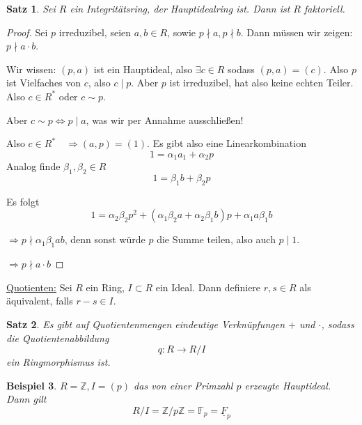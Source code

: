 \documentclass[a4paper,12pt,numbers=noenddot,parskip=full]{scrartcl}
\newcommand{\setZ}{\mathbb{Z}}
\newcommand{\heading}{\underline}
\theoremstyle{dotless}
\newtheorem{theorem}{Satz}[section]
\newtheorem{example}[theorem]{Beispiel}
\theoremstyle{remark}
\begin{document}
	\begin{theorem}
		Sei $R$ ein Integritätsring, der Hauptidealring ist. Dann ist $R$ faktoriell.
	\end{theorem}

	\begin{proof}
		Sei $p$ irreduzibel, seien $a,b \in R$, sowie $p \nmid a, p \nmid b$. Dann müssen wir zeigen: $p \nmid a \cdot b$.
		
		Wir wissen: $(p,a)$ ist ein Hauptideal, also $\exists c \in R$ sodass $(p,a) = (c)$. Also $p$ ist Vielfaches von $c$, also $c \mid p$. Aber $p$ ist irreduzibel, hat also keine echten Teiler. Also $c \in R^*$ oder $c \sim p$.
		
		Aber $c \sim p \Leftrightarrow p \mid a$, was wir per Annahme ausschließen!
		
		Also $c \in R^* \quad\Rightarrow (a,p) = (1)$. Es gibt also eine Linearkombination
		\begin{equation*}
			1 = \alpha_1 a_1 + \alpha_2 p \tag{$*$}
		\end{equation*}
		Analog finde $\beta_1, \beta_2 \in R$
		\begin{equation*}
			1 = \beta_1 b + \beta_2 p \tag{$\leftmoon$}
		\end{equation*}
		
		Es folgt
		\begin{equation*}
			1 = \alpha_2 \beta_2 p^2 + (\alpha_1 \beta_2 a + \alpha_2 \beta_1 b)p + \alpha_1 a \beta_1 b
		\end{equation*}
		
		$\Rightarrow p \nmid \alpha_1 \beta_1 a b$, denn sonst würde $p$ die Summe teilen, also auch $p \mid 1$.
		
		$\Rightarrow p \nmid a \cdot b$
	\end{proof}

	\heading{Quotienten:} Sei $R$ ein Ring, $I \subset R$ ein Ideal. Dann definiere $r,s \in R$ als äquivalent, falls $r - s \in I$.
	
	\begin{theorem}
		Es gibt auf Quotientenmengen eindeutige Verknüpfungen $+$ und $\cdot$, sodass die Quotientenabbildung
		\begin{equation*}
			q: R \to R/I
		\end{equation*}
		ein Ringmorphismus ist.
	\end{theorem}

	\begin{example}
		$R = \setZ, I = (p)$ das von einer Primzahl $p$ erzeugte Hauptideal. Dann gilt
		\begin{equation*}
			R/I = \setZ / p \setZ = \mathbb{F}_p = \underline{F}_p
		\end{equation*}
	\end{example}
\end{document}
